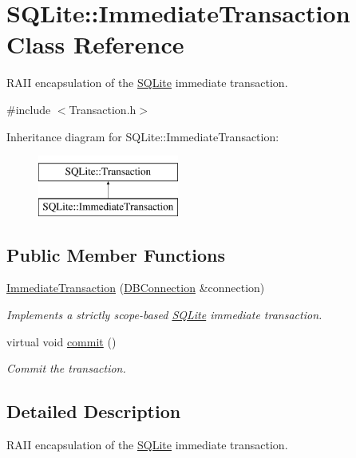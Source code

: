 \hypertarget{a00008}{\section{S\-Q\-Lite\-:\-:Immediate\-Transaction Class Reference}
\label{a00008}
}


R\-A\-I\-I encapsulation of the \hyperlink{a00038}{S\-Q\-Lite} immediate transaction.  




{\ttfamily \#include $<$Transaction.\-h$>$}

Inheritance diagram for S\-Q\-Lite\-:\-:Immediate\-Transaction\-:\begin{figure}[H]
\begin{center}
\leavevmode
\includegraphics[height=2.000000cm]{a00008}
\end{center}
\end{figure}
\subsection*{Public Member Functions}
\begin{DoxyCompactItemize}
\item 
\hyperlink{a00008_a3c6f88a4f4f6b299461c4a30a79b17e1}{Immediate\-Transaction} (\hyperlink{a00004}{D\-B\-Connection} \&connection)
\begin{DoxyCompactList}\small\item\em Implements a strictly scope-\/based \hyperlink{a00038}{S\-Q\-Lite} immediate transaction. \end{DoxyCompactList}\item 
\hypertarget{a00014_a9b251d84198cdc2c0208ad566fec0287}{virtual void \hyperlink{a00014_a9b251d84198cdc2c0208ad566fec0287}{commit} ()}\label{a00014_a9b251d84198cdc2c0208ad566fec0287}

\begin{DoxyCompactList}\small\item\em Commit the transaction. \end{DoxyCompactList}\end{DoxyCompactItemize}


\subsection{Detailed Description}
R\-A\-I\-I encapsulation of the \hyperlink{a00038}{S\-Q\-Lite} immediate transaction. 

